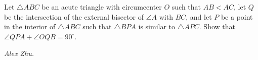 Let $\triangle ABC$ be an acute triangle with circumcenter $O$ such that $AB<AC$, let $Q$ be the intersection of the external bisector of $\angle A$ with $BC$, and let $P$ be a point in the interior of $\triangle ABC$ such that $\triangle BPA$ is similar to $\triangle APC$. Show that $\angle QPA + \angle OQB = 90^{\circ}$.

\textit{Alex Zhu.}